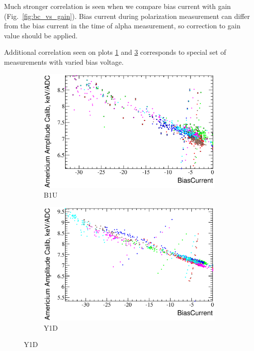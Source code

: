 \documentclass[a4paper,12pt]{article}
\begin{document}
Much stronger correlation is seen when we compare bias current with gain (Fig.~\ref{fig:bc_vs_gain}).
Bias current during polarization measurement can differ from the bias current in the time of
alpha measurement, so correction to gain value should be applied.

Additional correlation seen on plots \ref{bc_vs_gain-b1u} and \ref{bc_vs_gain-y1d} corresponds to
special set of measurements with varied bias voltage.

\begin{figure}[p]
\begin{subfigure}[b]{0.5\textwidth}
\includegraphics[width=\textwidth]{gfx/run13_alpha_study/B1U/c_hBiasCurrent_AmAmpCoef.eps}
\caption{B1U}\label{bc_vs_gain-b1u}
\end{subfigure}
\begin{subfigure}[b]{0.5\textwidth}
\includegraphics[width=\textwidth]{gfx/run13_alpha_study/Y1D/c_hBiasCurrent_AmAmpCoef.eps}
\caption{Y1D}\label{bc_vs_gain-y1d}
\end{subfigure}


\end{figure}
\end{document}
